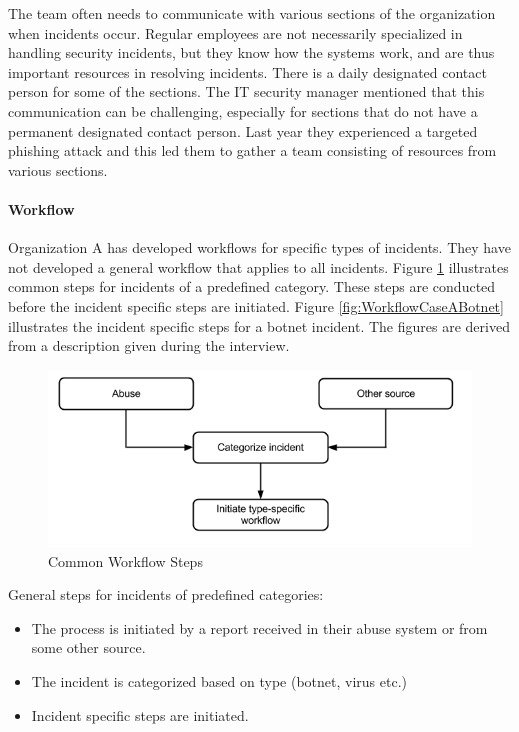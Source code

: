 The team often needs to communicate with various sections of the organization when incidents occur. Regular employees are not necessarily specialized in handling security incidents, but they know how the systems work, and are thus important resources in resolving incidents. There is a daily designated contact person for some of the sections. The IT security manager mentioned that this communication can be challenging, especially for sections that do not have a permanent designated contact person. Last year they experienced a targeted phishing attack and this led them to gather a team consisting of resources from various sections.

\paragraph{Workflow}
Organization A has developed workflows for specific types of incidents. They have not developed a general workflow that applies to all incidents. Figure \ref{fig:WorkflowCaseAGeneral} illustrates common steps for incidents of a predefined category. These steps are conducted before the incident specific steps are initiated. Figure \ref{fig:WorkflowCaseABotnet} illustrates the incident specific steps for a botnet incident. The figures are derived from a description given during the interview. 

\begin{figure}[H]
\begin{center}
\includegraphics[scale=0.53]{WorkflowCaseAGeneral.png}
\caption[Common Workflow Steps, Case A]{Common Workflow Steps}
\label{fig:WorkflowCaseAGeneral}
\end{center}
\end{figure}

General steps for incidents of predefined categories:
\begin{itemize}\itemsep-0.2cm
\item The process is initiated by a report received in their abuse system or from some other source. 
\item The incident is categorized based on type (botnet, virus etc.)
\item Incident specific steps are initiated.
\end{itemize}

